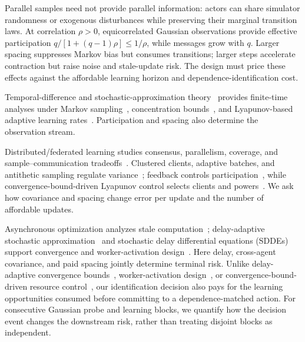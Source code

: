 \documentclass[journal]{IEEEtran}
\begin{document}
Parallel samples need not provide parallel information: actors can share simulator randomness or exogenous disturbances while preserving their marginal transition laws.
At correlation $\rho>0$, equicorrelated Gaussian observations provide effective participation $q/[1+(q-1)\rho]\le1/\rho$, while messages grow with $q$.
Larger spacing suppresses Markov bias but consumes transitions; larger steps accelerate contraction but raise noise and stale-update risk.
The design must price these effects against the affordable learning horizon and dependence-identification cost.

Temporal-difference and stochastic-approximation theory~\cite{sutton1988td,tsitsiklis1997td,robbins1951stochastic,polyak1992averaging} provides finite-time analyses under Markov sampling~\cite{bhandari2018finite,srikant2019finite,mou2022optimal}, concentration bounds~\cite{paulin2015concentration}, and Lyapunov-based adaptive learning rates~\cite{gupta2019adaptive}.
Participation and spacing also determine the observation stream.

Distributed/federated learning studies consensus, parallelism, coverage, and sample--communication tradeoffs~\cite{doan2019distributed,zhang2018decentralized,khodadadian2022federated,woo2023heterogeneity,salgia2024tradeoff,lan2023communication}.
Clustered clients, adaptive batches, and antithetic sampling regulate variance~\cite{fraboni2021clustered,de2017adaptive,ren2019antithetic}; feedback controls participation~\cite{cummins2025feedback}, while convergence-bound-driven Lyapunov control selects clients and powers~\cite{perazzone2025lyapunov}.
We ask how covariance and spacing change error per update and the number of affordable updates.

Asynchronous optimization analyzes stale computation~\cite{agarwal2011distributed,lian2015asynchronous,arjevani2020delayed}; delay-adaptive stochastic approximation~\cite{adibi2024delayed,dalfabbro2024dasa} and stochastic delay differential equations (SDDEs) support convergence and worker-activation design~\cite{yu2025sdde}.
Here delay, cross-agent covariance, and paid spacing jointly determine terminal risk.
Unlike delay-adaptive convergence bounds~\cite{dalfabbro2024dasa}, worker-activation design~\cite{yu2025sdde}, or convergence-bound-driven resource control~\cite{perazzone2025lyapunov}, our identification decision also pays for the learning opportunities consumed before committing to a dependence-matched action.
For consecutive Gaussian probe and learning blocks, we quantify how the decision event changes the downstream risk, rather than treating disjoint blocks as independent.
\end{document}
